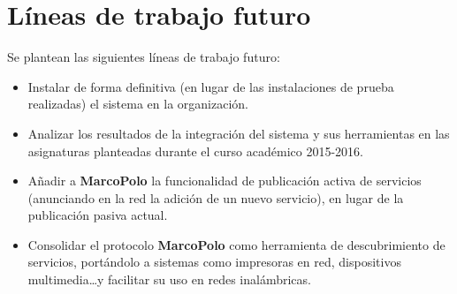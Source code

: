 \section{Líneas de trabajo futuro}

Se plantean las siguientes líneas de trabajo futuro:

\begin{itemize}
	\item Instalar de forma definitiva (en lugar de las instalaciones de prueba realizadas) el sistema en la organización.
	\item Analizar los resultados de la integración del sistema y sus herramientas en las asignaturas planteadas durante el curso académico 2015-2016.
	\item Añadir a \textbf{MarcoPolo} la funcionalidad de publicación activa de servicios (anunciando en la red la adición de un nuevo servicio), en lugar de la publicación pasiva actual.
	\item Consolidar el protocolo \textbf{MarcoPolo} como herramienta de descubrimiento de servicios, portándolo a sistemas como impresoras en red, dispositivos multimedia\dots y facilitar su uso en redes inalámbricas.
\end{itemize}

\citationneeded[TODO]